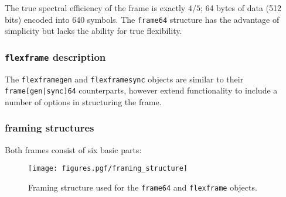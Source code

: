 The true spectral efficiency of the frame is exactly $4/5$; 64 bytes of data
(512 bits) encoded into 640 symbols.
The {\tt frame64} structure has the advantage of simplicity but lacks the
ability for true flexibility.

\subsubsection{{\tt flexframe} description}
\label{module:framing:frames:flexframe}
The {\tt flexframegen} and {\tt flexframesync} objects are similar to their
{\tt frame[gen|sync]64} counterparts, however extend functionality to include
a number of options in structuring the frame.

\subsubsection{framing structures}
\label{module:framing:frames:structures}
Both frames consist of six basic parts:


% 
%
\begin{figure}
\centering
  \texttt{[image: figures.pgf/framing\_structure]}
\caption{
    Framing structure used for the {\tt frame64} and {\tt flexframe}
    objects.}
\label{fig:module:framing:structure}
\end{figure}


